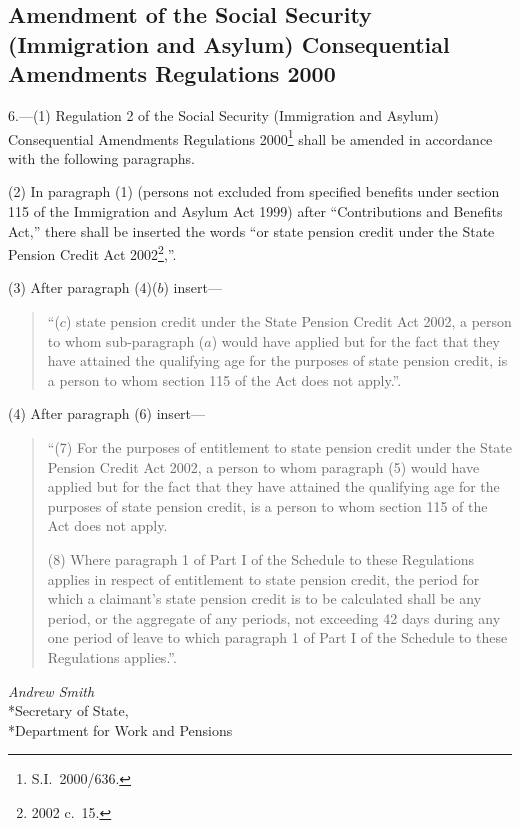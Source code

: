 \documentclass[12pt,a4paper]{article}
\begin{document}
\subsection[6. Amendment of the Social Security (Immigration and Asylum) Consequential Amendments Regulations 2000]{Amendment of the Social Security (Immigration and Asylum) Consequential Amendments Regulations 2000}

6.---(1)  Regulation 2 of the Social Security (Immigration and Asylum) Consequential Amendments Regulations 2000\footnote{S.I.\ 2000/636.} shall be amended in accordance with the following paragraphs.

(2) In paragraph (1) (persons not excluded from specified benefits under section 115 of the Immigration and Asylum Act 1999) after “Contributions and Benefits Act,” there shall be inserted the words “or state pension credit under the State Pension Credit Act 2002\footnote{2002 c.\ 15.},”.

(3) After paragraph (4)($b$)  insert—
\begin{quotation}
“($c$) state pension credit under the State Pension Credit Act 2002, a person to whom sub-paragraph ($a$)  would have applied but for the fact that they have attained the qualifying age for the purposes of state pension credit, is a person to whom section 115 of the Act does not apply.”.
\end{quotation}

(4) After paragraph (6) insert—
\begin{quotation}
“(7) For the purposes of entitlement to state pension credit under the State Pension Credit Act 2002, a person to whom paragraph (5) would have applied but for the fact that they have attained the qualifying age for the purposes of state pension credit, is a person to whom section 115 of the Act does not apply.

(8) Where paragraph 1 of Part I of the Schedule to these Regulations applies in respect of entitlement to state pension credit, the period for which a claimant’s state pension credit is to be calculated shall be any period, or the aggregate of any periods, not exceeding 42 days during any one period of leave to which paragraph 1 of Part I of the Schedule to these Regulations applies.”.
\end{quotation}

\bigskip


{\raggedleft
\emph{Andrew Smith}\\*Secretary of State,\\*Department for Work and Pensions

}
\end{document}
